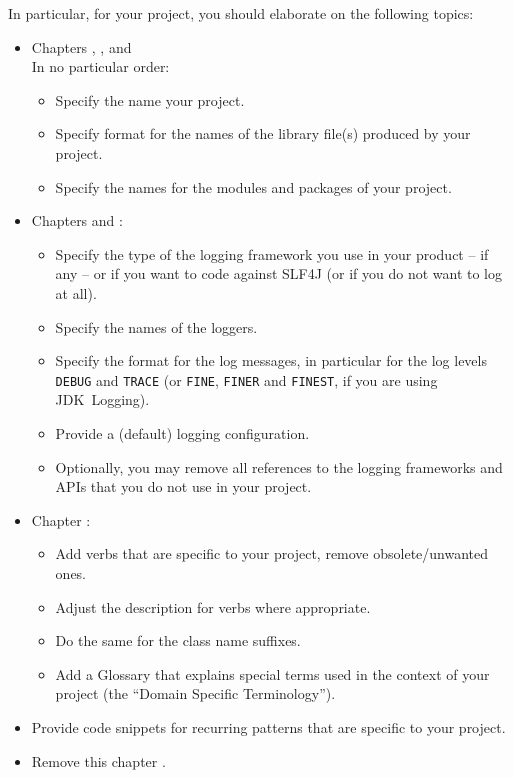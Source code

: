 In particular, for your project, you should elaborate on the following topics:
\begin{itemize}
\item{Chapters , ,  and \\
In no particular order:
    \begin{itemize}
    \item{Specify the name your project.}
    \item{Specify format for the names of the library file(s) produced by your project.}
    \item{Specify the names for the modules and packages of your project.}
    \end{itemize}}

\item{Chapters  and :
    \begin{itemize}
    \item{Specify the type of the logging framework you use in your product – if any – or if you want to code against SLF4J (or if you do not want to log at all).}
    \item{Specify the names of the loggers.}
    \item{Specify the format for the log messages, in particular for the log levels \verb#DEBUG# and \verb#TRACE# (or \verb#FINE#, \verb#FINER# and \verb#FINEST#, if you are using JDK~Logging).}
    \item{Provide a (default) logging configuration.}
    \item{Optionally, you may remove all references to the logging frameworks and APIs that you do not use in your project.}
    \end{itemize}}
    
\item{Chapter :
    \begin{itemize}
    \item{Add verbs that are specific to your project, remove obsolete/unwanted ones.}
    \item{Adjust the description for verbs where appropriate.}
    \item{Do the same for the class name suffixes.}
    \item{Add a Glossary that explains special terms used in the context of your project (the “Domain Specific Terminology”).}
    \end{itemize}}

\item{Provide code snippets for recurring patterns that are specific to your project.}

\item{Remove this chapter .}
\end{itemize}

